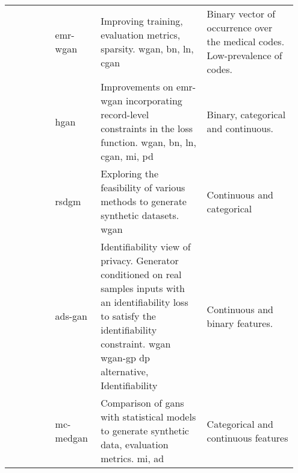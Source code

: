 \begin{landscape}
\begin{longtable}[l]{@{}p{0.15\linewidth}p{0.15\linewidth}p{0.35\linewidth}p{0.3\linewidth}@{}}
        \citeauthor{Zhang2020} & \gls{emr-wgan}
        & Improving training, evaluation metrics, sparsity. \gls{wgan}, \gls{bn}, \gls{ln}, \gls{cgan}
        & Binary vector of occurrence over the medical codes. Low-prevalence of codes. \\
        
        \citeauthor{yan2020generating} & \gls{hgan}
        & Improvements on \gls{emr-wgan} incorporating record-level constraints in the loss function.  \gls{wgan}, \gls{bn}, \gls{ln}, \gls{cgan}, \gls{mi}, \gls{pd}
        & Binary, categorical and continuous.\\
        
        \citeauthor{ozyigit2020generation} & \gls{rsdgm}
        & Exploring the feasibility of various methods to generate synthetic datasets. \gls{wgan}
        & Continuous and categorical\\
        
        \citeauthor{Yoon2020-anon} & \gls{ads-gan}
        & Identifiability view of privacy. Generator conditioned on real samples inputs with an identifiability loss to satisfy the identifiability constraint. \gls{wgan} \gls{wgan-gp} \gls{dp} alternative, Identifiability
        & Continuous and binary features.\\
        
        \citeauthor{Goncalves2020} & \gls{mc-medgan}
        & Comparison of \glspl{gan} with statistical models to generate synthetic data, evaluation metrics. \gls{mi}, \gls{ad}
        & Categorical and continuous features\\
           
        \hline
        
    \end{longtable}
\end{landscape}